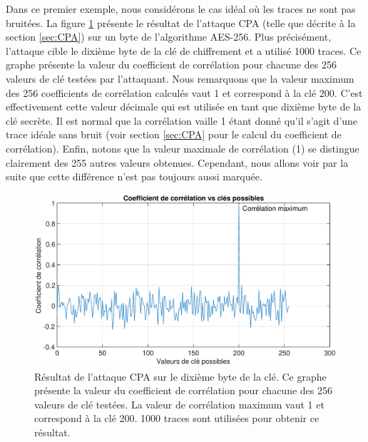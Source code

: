 \documentclass[oneside]{book}
\begin{document}
Dans ce premier exemple, nous considérons le cas idéal où les traces ne sont pas bruitées. La figure \ref{fig:sim_10000_traces} présente le résultat de l'attaque CPA (telle que décrite à la section \ref{sec:CPA}) sur un byte de l'algorithme AES-256. Plus précisément, l'attaque cible le dixième byte de la clé de chiffrement et a utilisé 1000 traces. Ce graphe présente la valeur du coefficient de corrélation pour chacune des 256 valeurs de clé testées par l'attaquant. Nous remarquons que la valeur maximum des 256 coefficients de corrélation calculés vaut 1 et correspond à la clé 200. C'est effectivement cette valeur décimale qui est utilisée en tant que dixième byte de la clé secrète. Il est normal que la corrélation vaille 1 étant donné qu'il s'agit d'une trace idéale sans bruit (voir section \ref{sec:CPA} pour le calcul du coefficient de corrélation). Enfin, notons que la valeur maximale de corrélation (1) se distingue clairement des 255 autres valeurs obtenues. Cependant, nous allons voir par la suite que cette différence n'est pas toujours aussi marquée. 

\begin{figure}[htbp]
    \hspace{-2cm}
    \includegraphics[scale=0.4]{image/sim_10000_traces}
    \caption{Résultat de l'attaque CPA sur le dixième byte de la clé. Ce graphe présente la valeur du coefficient de corrélation pour chacune des 256 valeurs de clé testées. La valeur de corrélation maximum vaut 1 et correspond à la clé 200. 1000 traces sont utilisées pour obtenir ce résultat.}
    \label{fig:sim_10000_traces} 
\end{figure}

\newpage
\end{document}
